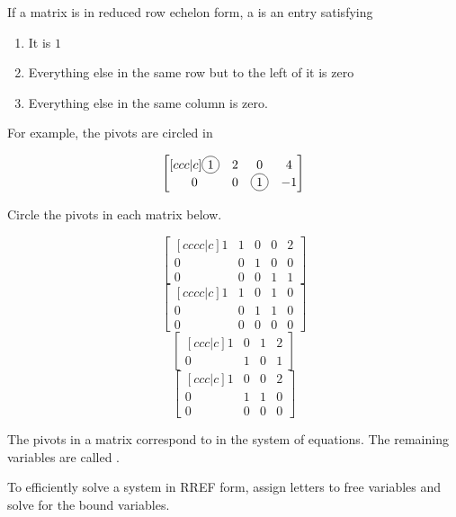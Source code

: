 \begin{applicationActivities}{2}{4}
\begin{definition}
If a matrix is in reduced row echelon form, a  is an entry satisfying
\begin{enumerate}[1.]
\item It is $1$
\item Everything else in the same row but to the left of it is zero
\item Everything else in the same column is zero.
\end{enumerate}

For example, the pivots are circled in 

\[\begin{bmatrix}[ccc|c] \circledNumber{1} & 2 & 0 & 4 \\ 0 & 0 & \circledNumber{1} & -1 \end{bmatrix}\]
\end{definition}


\begin{activity}{5}
Circle the pivots in each matrix below.
\begin{multicols}{2}
\[ \begin{bmatrix}[cccc|c] 1 & 1 & 0 & 0 & 2 \\ 0 & 0 & 1 & 0 &  0 \\ 0 & 0 & 0 &  1 & 1 \end{bmatrix} \]
\[ \begin{bmatrix}[cccc|c] 1 & 1 & 0 & 1 & 0 \\ 0 & 0 & 1 & 1 & 0 \\ 0 & 0 & 0 & 0  & 0 \end{bmatrix} \]
\[ \begin{bmatrix}[ccc|c] 1 & 0 & 1 & 2 \\ 0 & 1 & 0 & 1 \end{bmatrix} \]
\[ \begin{bmatrix}[ccc|c] 1 & 0 & 0 & 2 \\ 0 & 1 & 1 & 0 \\ 0 & 0 & 0 & 0 \end{bmatrix} \]
\end{multicols}
\end{activity}

\begin{definition}
The pivots in a matrix correspond to  in the system of equations.  The remaining variables are called .

To efficiently solve a system in RREF form, assign letters to free variables and solve for the bound variables.
\end{definition}


\end{applicationActivities}
